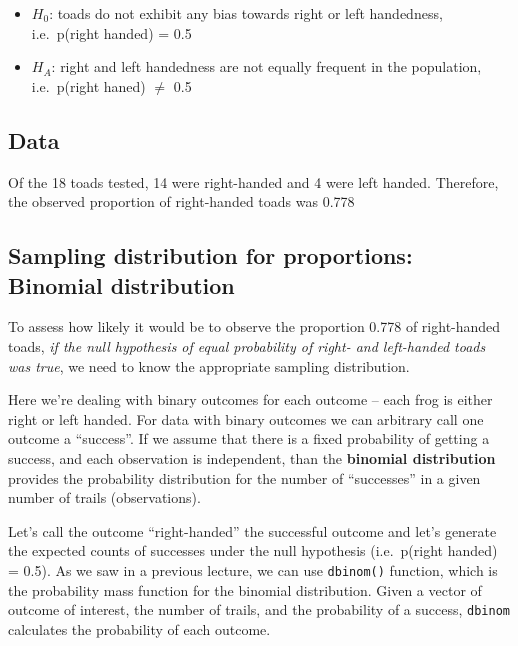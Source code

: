 \documentclass[]{book}
\providecommand{\tightlist}{%
  \setlength{\itemsep}{0pt}\setlength{\parskip}{0pt}}
\theoremstyle{definition}
\theoremstyle{definition}
\theoremstyle{definition}
\theoremstyle{remark}
\begin{document}
\begin{itemize}
\tightlist
\item
  \(H_0\): toads do not exhibit any bias towards right or left
  handedness, i.e.~p(right handed) = 0.5
\item
  \(H_A\): right and left handedness are not equally frequent in the
  population, i.e.~p(right haned) \(\neq\) 0.5
\end{itemize}

\hypertarget{data-2}{%
\subsection{Data}\label{data-2}}

Of the 18 toads tested, 14 were right-handed and 4 were left handed.
Therefore, the observed proportion of right-handed toads was 0.778

\hypertarget{sampling-distribution-for-proportions-binomial-distribution}{%
\subsection{Sampling distribution for proportions: Binomial
distribution}\label{sampling-distribution-for-proportions-binomial-distribution}}

To assess how likely it would be to observe the proportion 0.778 of
right-handed toads, \emph{if the null hypothesis of equal probability of
right- and left-handed toads was true}, we need to know the appropriate
sampling distribution.

Here we're dealing with binary outcomes for each outcome -- each frog is
either right or left handed. For data with binary outcomes we can
arbitrary call one outcome a ``success''. If we assume that there is a
fixed probability of getting a success, and each observation is
independent, than the \textbf{binomial distribution} provides the
probability distribution for the number of ``successes'' in a given
number of trails (observations).

Let's call the outcome ``right-handed'' the successful outcome and let's
generate the expected counts of successes under the null hypothesis
(i.e.~p(right handed) = 0.5). As we saw in a previous lecture, we can
use \texttt{dbinom()} function, which is the probability mass function
for the binomial distribution. Given a vector of outcome of interest,
the number of trails, and the probability of a success, \texttt{dbinom}
calculates the probability of each outcome.
\end{document}

